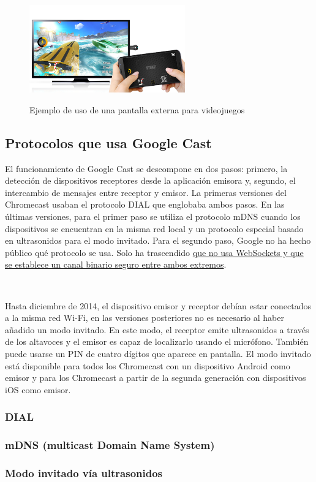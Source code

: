 \begin{figure}[H]
	\centering
	\includegraphics[width=0.6\textwidth]{./Imagenes/gameexample.jpg}
	\label{fig:fondo}
	\caption{Ejemplo de uso de una pantalla externa para videojuegos}
\end{figure}


\subsection{Protocolos que usa Google Cast}

El funcionamiento de Google Cast se descompone en dos pasos: primero, la detección de dispositivos receptores desde la aplicación emisora y, segundo, el intercambio de mensajes entre receptor y emisor.
La primeras versiones del Chromecast usaban el protocolo DIAL que englobaba ambos pasos.
En las últimas versiones, para el primer paso se utiliza el protocolo mDNS cuando los dispositivos se encuentran en la misma red local y un protocolo especial basado en ultrasonidos para el modo invitado. Para el segundo paso, Google no ha hecho público qué protocolo se usa. Solo ha trascendido \href{https://plus.google.com/116723992087294619013/posts/d6TLN4S8mrH}{que no usa WebSockets y que se establece un canal binario seguro entre ambos extremos}.

\

Hasta diciembre de 2014, el dispositivo emisor y receptor debían estar conectados a la misma red Wi-Fi, en las versiones posteriores no es necesario al haber añadido un modo invitado.
En este modo, el receptor emite ultrasonidos a través de los altavoces y el emisor es capaz de localizarlo usando el micrófono.
También puede usarse un PIN de cuatro dígitos que aparece en pantalla.
El modo invitado está disponible para todos los Chromecast con un dispositivo Android como emisor y para los Chromecast a partir de la segunda generación con dispositivos iOS como emisor.

\subsubsection{DIAL}


\subsubsection{mDNS (multicast Domain Name System)}


\subsubsection{Modo invitado vía ultrasonidos}

